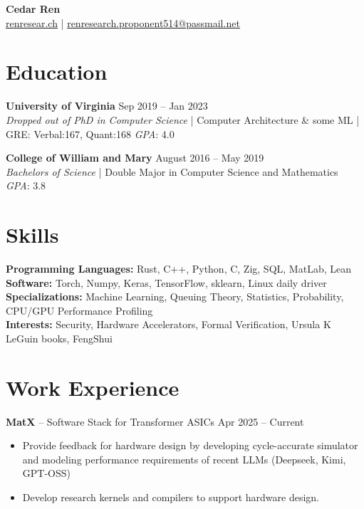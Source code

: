 \documentclass[10pt,letterpaper]{article}
\begin{document}
\begin{center}
    {\Large \textbf{Cedar Ren}} \\
    \href{https://renresear.ch}{renresear.ch} \hspace{0.3cm} | \hspace{0.3cm} \href{mailto:renresearch.proponent514@passmail.net}{renresearch.proponent514@passmail.net}
\end{center}

\section{Education}

\textbf{University of Virginia} \hfill Sep 2019 -- Jan 2023 \\
\textit{Dropped out of PhD in Computer Science} | Computer Architecture \& some ML | GRE: Verbal:167, Quant:168 \hfill \textit{GPA}: 4.0

\textbf{College of William and Mary} \hfill August 2016 -- May 2019 \\
\textit{Bachelors of Science} | Double Major in Computer Science and Mathematics \hfill \textit{GPA}: 3.8

\section{Skills}

\textbf{Programming Languages:} Rust, C++, Python, C, Zig, SQL, MatLab, Lean \\
\textbf{Software:} Torch, Numpy, Keras, TensorFlow, sklearn, Linux daily driver \\
\textbf{Specializations:} Machine Learning, Queuing Theory, Statistics, Probability, CPU/GPU Performance Profiling \\
\textbf{Interests:} Security, Hardware Accelerators, Formal Verification, Ursula K LeGuin books, FengShui

\section{Work Experience}

\vspace{3pt}
\textbf{MatX} -- Software Stack for Transformer ASICs \hfill Apr 2025 -- Current
\begin{itemize}
    \item Provide feedback for hardware design by developing cycle-accurate simulator and modeling performance requirements of recent LLMs (Deepseek, Kimi, GPT-OSS)
    \item Develop research kernels and compilers to support hardware design.
\end{itemize}
\end{document}
